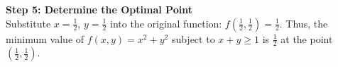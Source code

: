 \documentclass[]{article}
\begin{document}
	\textbf{Step 5: Determine the Optimal Point}\\
	Substitute $x = \frac{1}{2}$, $y = \frac{1}{2}$ into the original function:
	$f\left(\frac{1}{2}, \frac{1}{2}\right) = \frac{1}{2}$.
	Thus, the minimum value of $f(x, y) = x^2 + y^2$ subject to $x + y \geq 1$ is $\frac{1}{2}$ at the point $\left(\frac{1}{2}, \frac{1}{2}\right)$.
	
	
\end{document}
